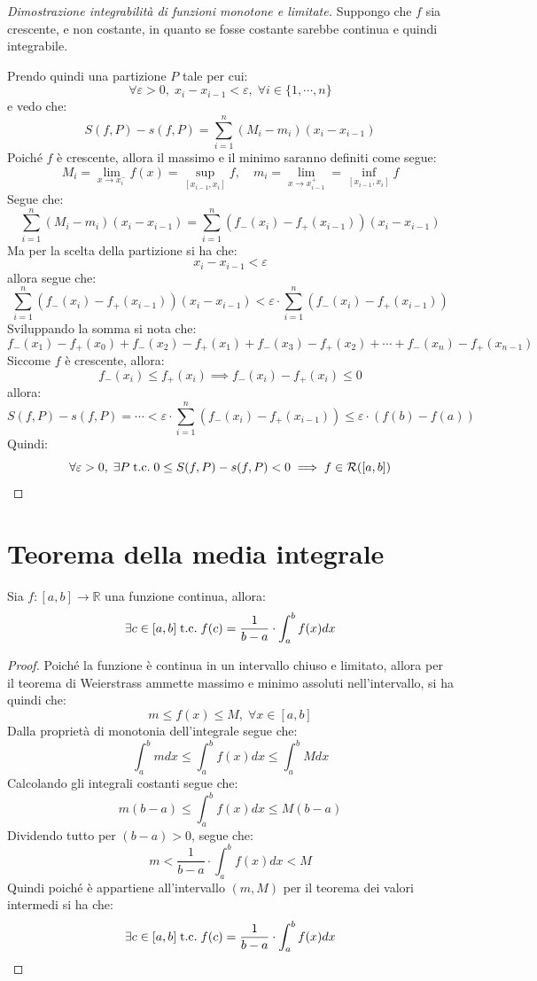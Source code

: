 \documentclass[a4paper,12pt,openright]{book}
\begin{document}
	\begin{proof}[Dimostrazione integrabilità di funzioni monotone e limitate]
		Suppongo che $f$ sia crescente, e non costante, in quanto se fosse costante sarebbe continua e quindi integrabile.
		
		Prendo quindi una partizione $P$ tale per cui:
		\[\forall \varepsilon > 0, \; x_i - x_{i - 1} < \varepsilon, \; \forall i \in \{1, \cdots, n\}\]
		e vedo che:
		\[S(f, P) - s(f, P) = \sum_{i=1}^{n} (M_i - m_i)(x_i - x_{i - 1})\]
		Poiché $f$ è crescente, allora il massimo e il minimo saranno definiti come segue:
		\[M_i = \lim_{x \rightarrow x_i^-} f(x) = \sup_{[x_{i-1},x_i]} f, \quad m_i = \lim_{x \rightarrow x_{i - 1}^+} = \inf_{[x_{i-1},x_i]} f\]
		Segue che:
		\[\sum_{i=1}^{n} (M_i - m_i)(x_i - x_{i - 1}) = \sum_{i = 1}^{n} (f_-(x_i) - f_+(x_{i - 1}))(x_i - x_{i - 1})\]
		Ma per la scelta della partizione si ha che:
		\[x_i - x_{i - 1} < \varepsilon\]
		allora segue che:
		\[\sum_{i = 1}^{n} (f_-(x_i) - f_+(x_{i - 1}))(x_i - x_{i - 1}) < \varepsilon \cdot \sum_{i = 1}^{n} (f_-(x_i) - f_+(x_{i - 1}))\]
		Sviluppando la somma si nota che:
		\[f_-(x_1) - f_+(x_0) + f_-(x_2) - f_+(x_1) + f_-(x_3) - f_+(x_2) + \cdots + f_-(x_n) - f_+(x_{n - 1})\]
		Siccome $f$ è crescente, allora:
		\[f_-(x_i) \leq f_+ (x_i) \implies f_-(x_i) - f_+ (x_i) \leq 0\]
		allora:
		\[S(f, P) - s(f, P) = \cdots < \varepsilon \cdot \sum_{i = 1}^{n} (f_-(x_i) - f_+(x_{i - 1})) \leq \varepsilon \cdot (f(b) - f(a))\]
		Quindi:
		\[\forall \varepsilon > 0, \; \exists P \;\text{t.c.}\; 0 \leq S(f, P) - s(f, P) < 0 \implies f \in \mathcal{R}([a, b])
		\]
	\end{proof}
	
	\newpage
	
	\section{Teorema della media integrale}
	Sia $f: [a, b] \longrightarrow \mathbb{R}$ una funzione continua, allora:
	\[\exists c \in [a, b] \;\text{t.c.}\; f(c) = \frac{1}{b - a}\cdot \int_{a}^{b}f(x)dx\]
	
	\begin{proof}
		Poiché la funzione è continua in un intervallo chiuso e limitato, allora per il teorema di Weierstrass ammette massimo e minimo assoluti nell'intervallo, si ha quindi che:
		\[m \leq f(x) \leq M, \; \forall x \in [a, b]\]
		Dalla proprietà di monotonia dell'integrale segue che:
		\[\int_{a}^{b} mdx \leq \int_{a}^{b} f(x)dx \leq \int_{a}^{b} Mdx\]
		Calcolando gli integrali costanti segue che:
		\[m(b - a) \leq \int_{a}^{b} f(x)dx \leq M(b - a)\]
		Dividendo tutto per $(b - a) > 0$, segue che:
		\[m < \frac{1}{b - a}\cdot \int_{a}^{b}f(x)dx < M\]
		Quindi poiché è appartiene all'intervallo $(m, M)$ per il teorema dei valori intermedi si ha che:
		\[\exists c \in [a, b] \;\text{t.c.}\; f(c) = \frac{1}{b - a}\cdot \int_{a}^{b}f(x)dx\]
	\end{proof}
	
\end{document}
